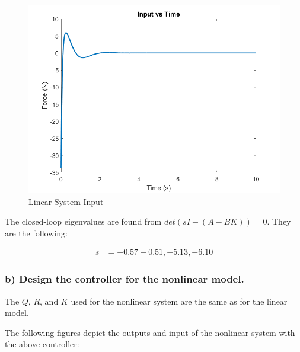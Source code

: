 \begin{figure}[!ht]
    \centering
    \includegraphics[width=\linewidth]{figs/sfsp_input.png}
    \caption{Linear System Input}
    \label{}
\end{figure}

\clearpage

The closed-loop eigenvalues are found from $det(sI-(A-BK))=0$. They are the following:

\begin{equation*}
    \begin{split}
        s & = -0.57\pm0.51, -5.13, -6.10
    \end{split}
\end{equation*}

\subsubsection*{b) Design the controller for the nonlinear model.}

The $\bar{Q}$, $\bar{R}$, and $\bar{K}$ used for the nonlinear system are the same as for the linear model.

The following figures depict the outputs and input of the nonlinear system with the above controller:

